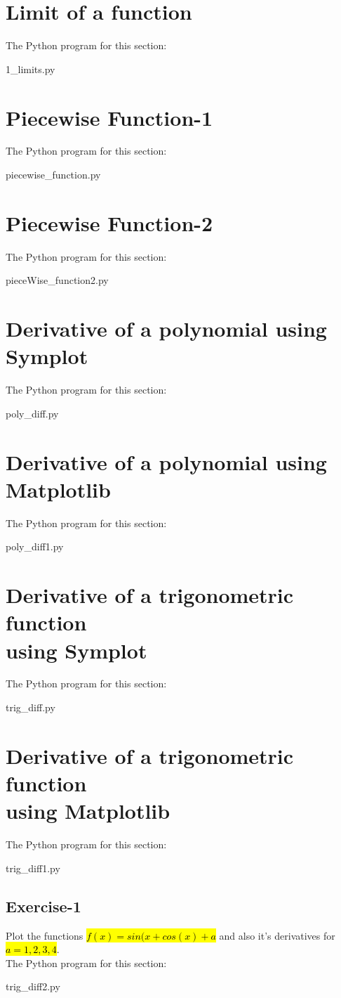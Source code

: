 \documentclass{article}
\begin{document}



\begin{Large}
\tableofcontents
\end{Large}


\newpage
\section{Limit of a function}
The Python program for this section:

{1_limits.py}

\newpage
\section{Piecewise Function-1}
The Python program for this section:

{piecewise_function.py}
\section{Piecewise Function-2}
The Python program for this section:

{pieceWise_function2.py}

\newpage
\section{Derivative of a polynomial using Symplot}
The Python program for this section:

{poly_diff.py}
\newpage
\section{Derivative of a polynomial using Matplotlib}
The Python program for this section:

{poly_diff1.py}

\newpage
\section{Derivative of a trigonometric function\\ using Symplot}
The Python program for this section:

{trig_diff.py}
\newpage
\section{Derivative of a trigonometric function\\ using Matplotlib}
The Python program for this section:

{trig_diff1.py}
\newpage
\subsection{Exercise-1}
Plot the functions \hl{$f(x) = sin(x+cos(x) + a$} and also it's derivatives for \hl{$a=1,2,3,4$}. 
\\ 
The Python program for this section:

{trig_diff2.py}
\end{document}
